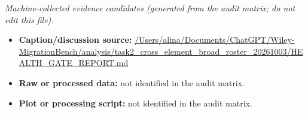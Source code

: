 \emph{Machine-collected evidence candidates (generated from the audit matrix; do not edit this file).}
\begin{itemize}[leftmargin=1.4em,noitemsep]
\item \textbf{Caption/discussion source:} \url{/Users/alina/Documents/ChatGPT/Wiley-MigrationBench/analysis/task2_cross_element_broad_roster_20261003/HEALTH_GATE_REPORT.md}
\item \textbf{Raw or processed data:} not identified in the audit matrix.
\item \textbf{Plot or processing script:} not identified in the audit matrix.
\end{itemize}
